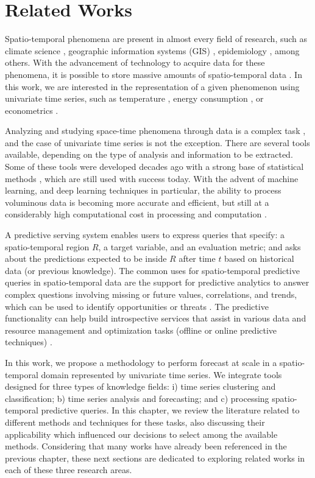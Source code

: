\chapter{Related Works}
\label{chapter_Related_Works}

Spatio-temporal phenomena are present in almost every field of research, such as climate science \cite{Faghmous2014, Guevara2020}, geographic information systems (GIS) \cite{ElGeresy2002, Shekhar2015}, epidemiology \cite{Malchow2007, Cabrera2019}, among others. With the advancement of technology to acquire data for these phenomena, it is possible to store massive amounts of spatio-temporal data \cite{Atluri2018}. In this work, we are interested in the representation of a given phenomenon using univariate time series, such as temperature \cite{Muhammet2012, Romilly2005}, energy consumption \cite{Abdelaal2008}, or econometrics \cite{Moral2003}.

Analyzing and studying space-time phenomena through data is a complex task \cite{Rao2008}, and the case of univariate time series is not the exception. There are several tools available, depending on the type of analysis and information to be extracted. Some of these tools were developed decades ago with a strong base of statistical methods \cite{Cressie2011, Finkenstadt2006}, which are still used with success today. With the advent of machine learning, and deep learning techniques in particular, the ability to process voluminous data is becoming more accurate and efficient, but still at a considerably high computational cost in processing and computation \cite{Yang2020, Karim2018}.

A predictive serving system \cite{Crankshaw2018} enables users to express queries that specify: a spatio-temporal region $R$, a target variable, and an evaluation metric; and asks about the predictions expected to be inside $R$ after time $t$ based on historical data (or previous knowledge). The common uses for spatio-temporal predictive queries in spatio-temporal data are the support for predictive analytics to answer complex questions involving missing or future values, correlations, and trends, which can be used to identify opportunities or threats \cite{Ghanta022019, Polyzotis2018}. The predictive functionality can help build introspective services that assist in various data and resource management and optimization tasks (offline or online predictive techniques) \cite{DeFilippo2018}.



In this work, we propose a methodology to perform forecast at scale in a spatio-temporal domain represented by univariate time series. We integrate tools designed for three types of knowledge fields: i) time series clustering and classification; b) time series analysis and forecasting; and c) processing spatio-temporal predictive queries. In this chapter, we review the literature related to different methods and techniques for these tasks, also discussing their applicability which influenced our decisions to select among the available methods. Considering that many works have already been referenced in the previous chapter, these next sections are dedicated to exploring related works in each of these three research areas.

